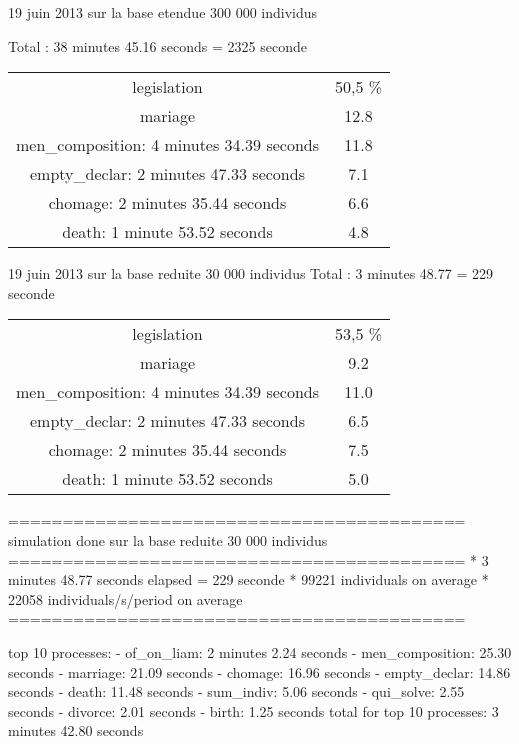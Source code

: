 


19 juin 2013
sur la base etendue 300 000 individus

Total : 38 minutes 45.16 seconds =  2325 seconde
\begin{tabular}{|c|c|}
\\
legislation & 50,5 \% \\
mariage & 12.8 \\
men_composition: 4 minutes 34.39 seconds  & 11.8 \\
empty_declar: 2 minutes 47.33 seconds  & 7.1 \\
chomage: 2 minutes 35.44 seconds  & 6.6 \\
death: 1 minute 53.52 seconds  & 4.8 \\
\end{tabular}



19 juin 2013
sur la base reduite 30 000 individus
Total : 3 minutes 48.77 =  229 seconde
\begin{tabular}{|c|c|}
\\
legislation & 53,5 \% \\
mariage & 9.2 \\
men_composition: 4 minutes 34.39 seconds  & 11.0 \\
empty_declar: 2 minutes 47.33 seconds  & 6.5 \\
chomage: 2 minutes 35.44 seconds  & 7.5 \\
death: 1 minute 53.52 seconds  & 5.0 \\
\end{tabular}


==========================================
 simulation done sur la base reduite 30 000 individus
==========================================
 * 3 minutes 48.77 seconds elapsed = 229 seconde
 * 99221 individuals on average
 * 22058 individuals/s/period on average
==========================================

top 10 processes:
 - of_on_liam: 2 minutes 2.24 seconds
 - men_composition: 25.30 seconds
 - marriage: 21.09 seconds
 - chomage: 16.96 seconds
 - empty_declar: 14.86 seconds
 - death: 11.48 seconds
 - sum_indiv: 5.06 seconds
 - qui_solve: 2.55 seconds
 - divorce: 2.01 seconds
 - birth: 1.25 seconds
total for top 10 processes: 3 minutes 42.80 seconds







